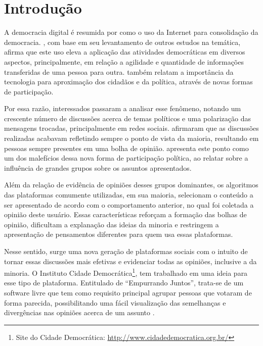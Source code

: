 \chapter[Introdução]{Introdução} \label{cap:introducao}

A democracia digital é resumida por  como o uso da Internet para consolidação da democracia.
, com base em seu levantamento de outros estudos na temática, afirma que este uso
eleva a aplicação das atividades democráticas em diversos aspectos, principalmente, em relação a agilidade e quantidade
de informações transferidas de uma pessoa para outra.  também relatam a importância da tecnologia
para aproximação dos cidadãos e da política, através de novas formas de participação. 

Por essa razão, interessados passaram a analisar esse fenômeno, notando um crescente número de discussões acerca de temas políticos 
e uma polarização das mensagens trocadas,
principalmente em redes sociais.  afirmaram que as discussões realizadas
acabavam refletindo sempre o ponto de vista da maioria, resultando em pessoas sempre presentes em uma bolha de opinião. 
apresenta este ponto como um dos malefícios dessa nova forma de participação política, ao relatar sobre a influência de grandes grupos 
sobre os assuntos apresentados.

Além da relação de evidência de opiniões desses grupos dominantes, os algoritmos
das plataformas comumente utilizadas, em sua maioria, selecionam o conteúdo a ser apresentado de acordo com o comportamento anterior,
no qual foi coletada a opinião deste usuário. Essas características reforçam a formação das bolhas de opinião, 
dificultam a explanação das ideias da minoria e restringem a apresentação de pensamentos diferentes para quem usa essas plataformas. 

Nesse sentido, surge uma nova geração de plataformas sociais com o intuito de tornar essas discussões mais efetivas 
e evidenciar todas as opiniões, inclusive a da minoria. O Instituto Cidade Democrática\footnote{Site do Cidade Democrática: \url{http://www.cidadedemocratica.org.br/}},
tem trabalhado em uma ideia para esse tipo de plataforma. Entitulado de ``Empurrando Juntos'', 
trata-se de um software livre que tem como requisito principal agrupar pessoas que votaram de forma parecida, 
possibilitando uma fácil visualização das semelhanças e divergências nas opiniões acerca de um assunto \cite{empurrandojuntos}. 

